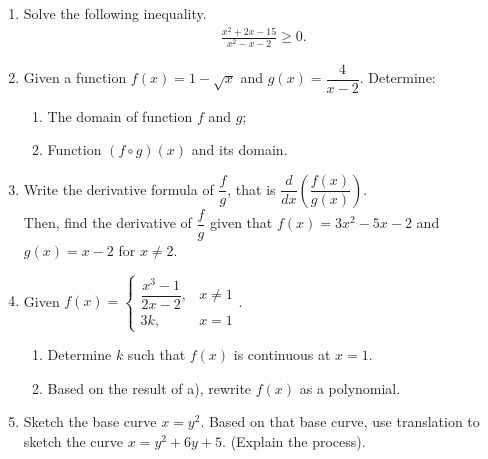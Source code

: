 \documentclass[10pt,openany,a4paper]{article}
\theoremstyle{definition}
\theoremstyle{definition}
\theoremstyle{plain}
\begin{document}
\begin{enumerate}
    \item Solve the following inequality.
    \begin{align*}
        \frac{x^2+2x-15}{x^2-x-2}\geq 0.
    \end{align*}

    \item Given a function $f(x)=1-\sqrt{x}$ and $g(x)=\dfrac{4}{x-2}$. Determine:
    \begin{enumerate}
        \item[a)] The domain of function $f$ and $g$;
        \item[b)] Function $(f\circ g)(x)$ and its domain.
    \end{enumerate}

    \item Write the derivative formula of $\dfrac{f}{g}$, that is $\dfrac{d}{dx}\left(\dfrac{f(x)}{g(x)}\right)$.\\
    Then, find the derivative of $\dfrac{f}{g}$ given that $f(x)=3x^2-5x-2$ and $g(x)=x-2$ for $x\neq 2$.

    \item Given $f(x)=\begin{cases}
        \dfrac{x^3-1}{2x-2}, & x\neq 1\\
        3k, & x=1
    \end{cases}$.
    \begin{enumerate}
        \item[a.] Determine $k$ such that $f(x)$ is continuous at $x=1$.
        \item[b.] Based on the result of a), rewrite $f(x)$ as a polynomial.
    \end{enumerate}

    \item Sketch the base curve $x=y^2$. Based on that base curve, use translation to sketch the curve $x=y^2+6y+5$. (Explain the process).
\end{enumerate}

\newpage
\end{document}
